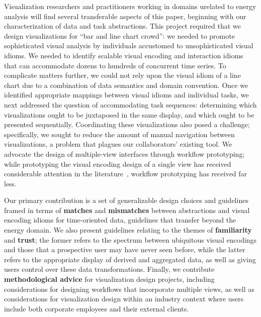 \documentclass[journal]{vgtc}                %
\newcommand{\bstart}[1]{\vspace{1mm} \noindent{\textbf{#1:}}}
\begin{document}
Visualization researchers and practitioners working in domains urelated to energy analysis will find several transferable aspects of this paper, beginning with our characterization of data and task abstractions.
This project required that we design visualizations for ``bar and line chart crowd'': we needed to promote sophisticated visual analysis by individuals accustomed to unsophisticated visual idioms.
We needed to identify scalable visual encoding and interaction idioms that can accommodate dozens to hundreds of concurrent time series.
To complicate matters further, we could not rely upon the visual idiom of a line chart due to a combination of data semantics and domain convention.
Once we identified appropriate mappings between visual idioms and individual tasks, we next addressed the question of accommodating task sequences: determining which visualizations ought to be juxtaposed in the same display, and which ought to be presented sequentially.
Coordinating these visualizations also posed a challenge; specifically, we sought to reduce the amount of manual navigation between visualizations, a problem that plagues our collaborators' existing tool.
We advocate the design of multiple-view interfaces through workflow prototyping; while prototyping the visual encoding design of a single view has received considerable attention in the literature~\cite{Lloyd2011}, workflow prototyping has received far less. 

\bstart{Contributions} Our primary contribution is a set of generalizable design choices and guidelines framed in terms of {\bf matches} and {\bf mismatches} between abstractions and visual encoding idioms for time-oriented data, guidelines that transfer beyond the energy domain.
We also present guidelines relating to the themes of {\bf familiarity} and {\bf trust}; the former refers to the spectrum between ubiquitous visual encodings and those that a prospective user may have never seen before, while the latter refers to the appropriate display of derived and aggregated data, as well as giving users control over these data transformations.
Finally, we contribute {\bf methodological advice} for visualization design projects, including considerations for designing workflows that incorporate multiple views, as well as considerations for visualization design within an industry context where users include both corporate employees and their external clients.
\end{document}
